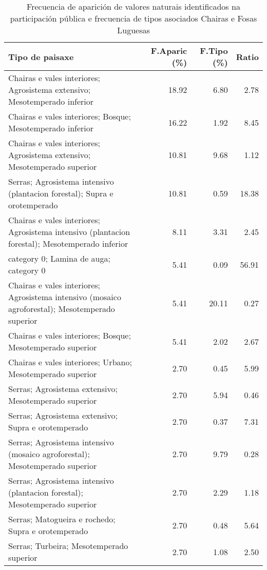\begin{table}[p]
\centering
\caption{Frecuencia de aparición de valores naturais identificados na participación pública e frecuencia de tipos asociados Chairas e Fosas Luguesas} 
\label{vsixotnat6}
\begin{tabular}{lrrr}
  \hline
Tipo de paisaxe & F.Aparic (\%) & F.Tipo (\%) & Ratio \\ 
  \hline
Chairas e vales interiores; Agrosistema extensivo; Mesotemperado inferior & 18.92 & 6.80 & 2.78 \\ 
  Chairas e vales interiores; Bosque; Mesotemperado inferior & 16.22 & 1.92 & 8.45 \\ 
  Chairas e vales interiores; Agrosistema extensivo; Mesotemperado superior & 10.81 & 9.68 & 1.12 \\ 
  Serras; Agrosistema intensivo (plantacion forestal); Supra e orotemperado & 10.81 & 0.59 & 18.38 \\ 
  Chairas e vales interiores; Agrosistema intensivo (plantacion forestal); Mesotemperado inferior & 8.11 & 3.31 & 2.45 \\ 
  category 0; Lamina de auga; category 0 & 5.41 & 0.09 & 56.91 \\ 
  Chairas e vales interiores; Agrosistema intensivo (mosaico agroforestal); Mesotemperado superior & 5.41 & 20.11 & 0.27 \\ 
  Chairas e vales interiores; Bosque; Mesotemperado superior & 5.41 & 2.02 & 2.67 \\ 
  Chairas e vales interiores; Urbano; Mesotemperado superior & 2.70 & 0.45 & 5.99 \\ 
  Serras; Agrosistema extensivo; Mesotemperado superior & 2.70 & 5.94 & 0.46 \\ 
  Serras; Agrosistema extensivo; Supra e orotemperado & 2.70 & 0.37 & 7.31 \\ 
  Serras; Agrosistema intensivo (mosaico agroforestal); Mesotemperado superior & 2.70 & 9.79 & 0.28 \\ 
  Serras; Agrosistema intensivo (plantacion forestal); Mesotemperado superior & 2.70 & 2.29 & 1.18 \\ 
  Serras; Matogueira e rochedo; Supra e orotemperado & 2.70 & 0.48 & 5.64 \\ 
  Serras; Turbeira; Mesotemperado superior & 2.70 & 1.08 & 2.50 \\ 
   \hline
\end{tabular}
\end{table}
